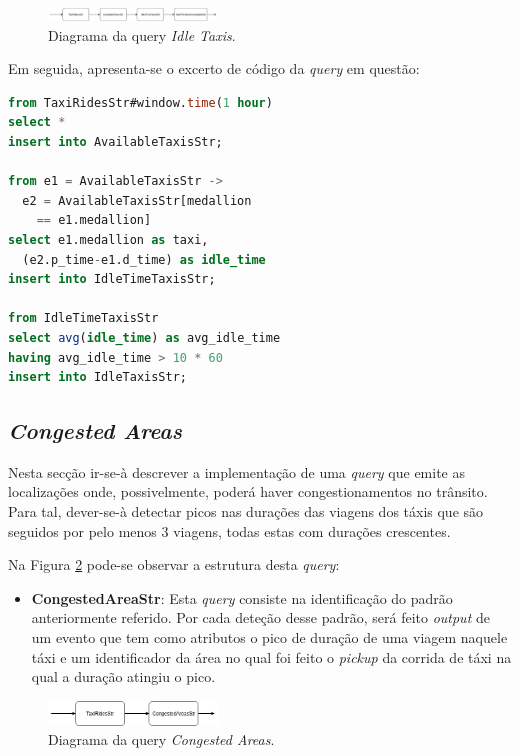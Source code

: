 \documentclass[article]{IEEEtran}
\begin{document}
\begin{figure}[hbtp]
    \centering
        \includegraphics[width=0.4\textwidth]{images/idleTime.png}
    \caption{Diagrama da query \textit{Idle Taxis}.}
    \label{fig:idleTaxisDiagram}
\end{figure}

Em seguida, apresenta-se o excerto de código da \textit{query} em questão:
\begin{lstlisting}[language=SQL]
from TaxiRidesStr#window.time(1 hour)
select *
insert into AvailableTaxisStr;

from e1 = AvailableTaxisStr -> 
  e2 = AvailableTaxisStr[medallion
    == e1.medallion]
select e1.medallion as taxi,
  (e2.p_time-e1.d_time) as idle_time
insert into IdleTimeTaxisStr;

from IdleTimeTaxisStr
select avg(idle_time) as avg_idle_time
having avg_idle_time > 10 * 60
insert into IdleTaxisStr;
\end{lstlisting}


\subsection{\textit{Congested Areas}}

Nesta secção ir-se-à descrever a implementação de uma \textit{query} que emite as localizações onde, possivelmente, poderá haver congestionamentos no trânsito. Para tal, dever-se-à detectar picos nas durações das viagens dos táxis que são seguidos por pelo menos 3 viagens, todas estas com durações crescentes.

Na Figura \ref{fig:congestedAreasDiagram} pode-se observar a estrutura desta \textit{query}:

\begin{itemize}
    \item \textbf{CongestedAreaStr}: Esta \textit{query} consiste na identificação do padrão anteriormente referido. Por cada  deteção desse padrão, será feito \textit{output} de um evento que tem como atributos o pico de duração de uma viagem naquele táxi e um identificador da área no qual foi feito o \textit{pickup} da corrida de táxi na qual a duração atingiu o pico.
\end{itemize} 
\begin{figure}[hbtp]
    \centering
        \includegraphics[width=0.4\textwidth]{images/congestedAreas}
    \caption{Diagrama da query \textit{Congested Areas}.}
    \label{fig:congestedAreasDiagram}
\end{figure}
\end{document}
